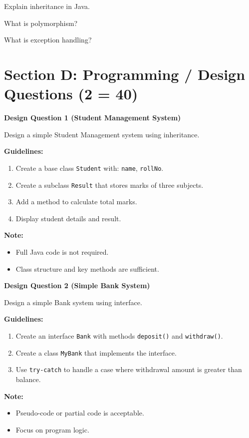 \documentclass{CWNUExam}
\begin{document}
\begin{problem}
Explain inheritance in Java.
\end{problem}

\begin{problem}
What is polymorphism?
\end{problem}

\begin{problem}
What is exception handling?
\end{problem}


\section{Section D: Programming / Design Questions (2  = 40)}

\begin{problem}
\textbf{Design Question 1 (Student Management System)}

Design a simple Student Management system using inheritance.

\textbf{Guidelines:}
\begin{enumerate}
  \item Create a base class \texttt{Student} with: \texttt{name}, \texttt{rollNo}.
  \item Create a subclass \texttt{Result} that stores marks of three subjects.
  \item Add a method to calculate total marks.
  \item Display student details and result.
\end{enumerate}

\textbf{Note:}
\begin{itemize}
  \item Full Java code is not required.
  \item Class structure and key methods are sufficient.
\end{itemize}
\end{problem}

\begin{problem}
\textbf{Design Question 2 (Simple Bank System)}

Design a simple Bank system using interface.

\textbf{Guidelines:}
\begin{enumerate}
  \item Create an interface \texttt{Bank} with methods \texttt{deposit()} and \texttt{withdraw()}.
  \item Create a class \texttt{MyBank} that implements the interface.
  \item Use \texttt{try-catch} to handle a case where withdrawal amount is greater than balance.
\end{enumerate}

\textbf{Note:}
\begin{itemize}
  \item Pseudo-code or partial code is acceptable.
  \item Focus on program logic.
\end{itemize}
\end{problem}
\end{document}
